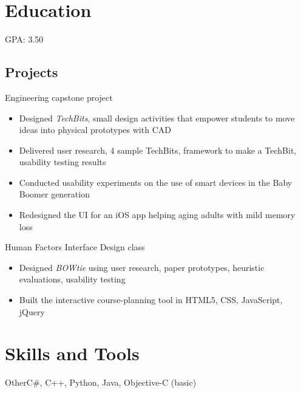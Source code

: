\documentclass[10pt,a4paper,sans]{moderncv}        %
\begin{document}
\bigskip
\section{Education}
{GPA: 3.50}  %

\subsection{Projects}

{Engineering capstone project}
{{}%
\begin{itemize} 
 	\item Designed \textit{TechBits}, small design activities that empower students to move ideas into physical prototypes with CAD
	 \item Delivered user research, 4 sample TechBits, framework to make a TechBit, usability testing results
\end{itemize}}

{}
{{}%
\begin{itemize} 
 	\item Conducted usability experiments on the use of smart devices in the Baby Boomer generation
	 \item Redesigned the UI for an iOS app helping aging adults with mild memory loss
\end{itemize}}

{Human Factors Interface Design class}
{{}%
\begin{itemize} 
	\item Designed \textit{BOWtie} using user research, paper prototypes, heuristic evaluations, usability testing
	\item Built the interactive course-planning tool in HTML5, CSS, JavaScript, jQuery
\end{itemize}}


\bigskip
\section{Skills and Tools}
 {Other}{C\#, C++,  Python, Java, Objective-C (basic)}
\end{document}
